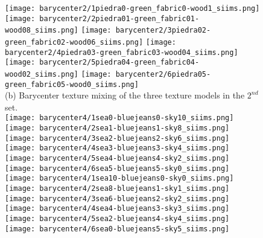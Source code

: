 \begin{figure}[ht!]
{\vspace{1mm}
    \texttt{[image: barycenter2/1piedra0-green\_fabric0-wood1\_siims.png]}
    \texttt{[image: barycenter2/2piedra01-green\_fabric01-wood08\_siims.png]}
    \texttt{[image: barycenter2/3piedra02-green\_fabric02-wood06\_siims.png]}
    \texttt{[image: barycenter2/4piedra03-green\_fabric03-wood04\_siims.png]}
    \texttt{[image: barycenter2/5piedra04-green\_fabric04-wood02\_siims.png]}
    \texttt{[image: barycenter2/6piedra05-green\_fabric05-wood0\_siims.png]} \\
(b) Barycenter texture mixing of the three texture models in the $2^{nd}$ set. \\
\vspace{1mm}
    \texttt{[image: barycenter4/1sea0-bluejeans0-sky10\_siims.png]}
    \texttt{[image: barycenter4/2sea1-bluejeans1-sky8\_siims.png]}
    \texttt{[image: barycenter4/3sea2-bluejeans2-sky6\_siims.png]}
    \texttt{[image: barycenter4/4sea3-bluejeans3-sky4\_siims.png]}
    \texttt{[image: barycenter4/5sea4-bluejeans4-sky2\_siims.png]}
    \texttt{[image: barycenter4/6sea5-bluejeans5-sky0\_siims.png]} \\
\vspace{1mm}
    \texttt{[image: barycenter4/1sea10-bluejeans0-sky0\_siims.png]}
    \texttt{[image: barycenter4/2sea8-bluejeans1-sky1\_siims.png]}
    \texttt{[image: barycenter4/3sea6-bluejeans2-sky2\_siims.png]}
    \texttt{[image: barycenter4/4sea4-bluejeans3-sky3\_siims.png]}
    \texttt{[image: barycenter4/5sea2-bluejeans4-sky4\_siims.png]}
    \texttt{[image: barycenter4/6sea0-bluejeans5-sky5\_siims.png]} \\
}
\end{figure}
